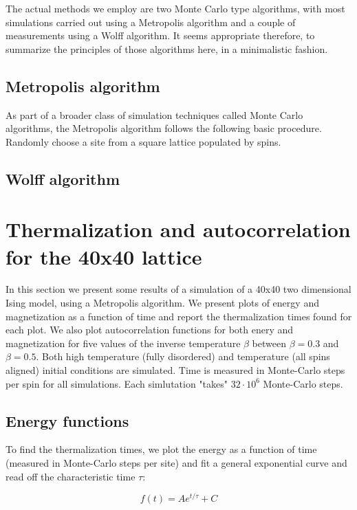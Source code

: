 \documentclass[11pt,a4paper]{article}
\begin{document}
 The actual methods we employ are two Monte Carlo type algorithms, with most simulations carried out using a 
 Metropolis algorithm and a couple of measurements using a Wolff algorithm. It seems appropriate therefore, to summarize the
 principles of those algorithms here, in a minimalistic fashion.

\subsection{Metropolis algorithm}
As part of a broader class of simulation techniques called Monte Carlo algorithms, the Metropolis algorithm follows the
 following basic procedure. Randomly choose a site from a square lattice populated by spins. 

\subsection{Wolff algorithm}


\section{Thermalization and autocorrelation for the 40x40 lattice}


In this section we present some results of a simulation of a 40x40 two dimensional Ising model, using a Metropolis algorithm.
 We present plots of energy and magnetization as a function of time and report the thermalization times found for each plot.
 We also plot autocorrelation functions for both enery and magnetization
 for five values of the inverse temperature $\beta$ between $\beta = 0.3$ and $\beta = 0.5$. 
 Both high temperature (fully disordered) and temperature (all spins aligned) initial conditions are simulated.
 Time is measured in Monte-Carlo steps per spin for all simulations. Each simlutation "takes" $32\cdot 10^6$ 
 Monte-Carlo steps.


\subsection{Energy functions}
To find the thermalization times, we plot the energy as a function of time (measured in Monte-Carlo steps per site)
 and fit a general exponential curve and read off the characteristic time $\tau$:

\begin{equation}\label{eq:exp_decay}
    f(t)=Ae^{t/\tau} + C
\end{equation}
\end{document}
